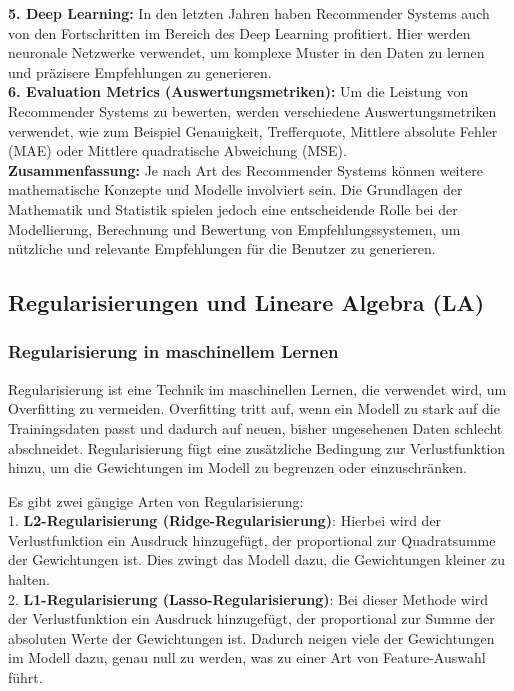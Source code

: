 \documentclass[12pt]{article}
\begin{document}
%
\textbf{5. Deep Learning:} In den letzten Jahren haben Recommender Systems auch von den Fortschritten im Bereich des Deep Learning profitiert. Hier werden neuronale Netzwerke verwendet, um komplexe Muster in den Daten zu lernen und präzisere Empfehlungen zu generieren.\\
%
\textbf{6. Evaluation Metrics (Auswertungsmetriken):} Um die Leistung von Recommender Systems zu bewerten, werden verschiedene Auswertungsmetriken verwendet, wie zum Beispiel Genauigkeit, Trefferquote, Mittlere absolute Fehler (MAE) oder Mittlere quadratische Abweichung (MSE).\\[0.2cm]
%
\textbf{Zusammenfassung:} Je nach Art des Recommender Systems können weitere mathematische Konzepte und Modelle involviert sein. Die Grundlagen der Mathematik und Statistik spielen jedoch eine entscheidende Rolle bei der Modellierung, Berechnung und Bewertung von Empfehlungssystemen, um nützliche und relevante Empfehlungen für die Benutzer zu generieren.\\


\newpage

\subsection{Regularisierungen und Lineare Algebra (LA)}

\subsubsection{Regularisierung in maschinellem Lernen}
Regularisierung ist eine Technik im maschinellen Lernen, die verwendet wird, um Overfitting zu vermeiden. Overfitting tritt auf, wenn ein Modell zu stark auf die Trainingsdaten passt und dadurch auf neuen, bisher ungesehenen Daten schlecht abschneidet. Regularisierung fügt eine zusätzliche Bedingung zur Verlustfunktion hinzu, um die Gewichtungen im Modell zu begrenzen oder einzuschränken.

Es gibt zwei gängige Arten von Regularisierung:\\

1. \textbf{L2-Regularisierung (Ridge-Regularisierung)}: Hierbei wird der Verlustfunktion ein Ausdruck hinzugefügt, der proportional zur Quadratsumme der Gewichtungen ist. Dies zwingt das Modell dazu, die Gewichtungen kleiner zu halten.\\

2. \textbf{L1-Regularisierung (Lasso-Regularisierung)}: Bei dieser Methode wird der Verlustfunktion ein Ausdruck hinzugefügt, der proportional zur Summe der absoluten Werte der Gewichtungen ist. Dadurch neigen viele der Gewichtungen im Modell dazu, genau null zu werden, was zu einer Art von Feature-Auswahl führt.\\
\end{document}
